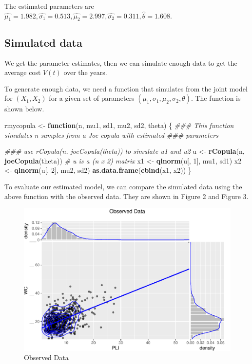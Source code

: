 \documentclass[11pt,]{article}
\newenvironment{Shaded}{\begin{snugshade}}{\end{snugshade}}
\newcommand{\CommentTok}[1]{\textcolor[rgb]{0.56,0.35,0.01}{\textit{#1}}}
\newcommand{\ControlFlowTok}[1]{\textcolor[rgb]{0.13,0.29,0.53}{\textbf{#1}}}
\newcommand{\DecValTok}[1]{\textcolor[rgb]{0.00,0.00,0.81}{#1}}
\newcommand{\KeywordTok}[1]{\textcolor[rgb]{0.13,0.29,0.53}{\textbf{#1}}}
\newcommand{\NormalTok}[1]{#1}
\newcommand{\StringTok}[1]{\textcolor[rgb]{0.31,0.60,0.02}{#1}}
\begin{document}
The estimated parameters are
\(\hat{\mu_{1}}= 1.982,\hat{\sigma_{1}}=0.513,\hat{\mu_{2}}=2.997,\hat{\sigma_{2}}=0.311,\hat{\theta}=1.608\).

\hypertarget{simulated-data}{%
\subsection{Simulated data}\label{simulated-data}}

We get the parameter estimates, then we can simulate enough data to get
the average cost \(V(t)\) over the years.

To generate enough data, we need a function that simulates from the
joint model for \((X_1,X_2)\) for a given set of parameters
\((\mu_{1}, \sigma_{1},\mu_{2},\sigma_{2},\theta)\). The function is
shown below.

\begin{Shaded}
\begin{Highlighting}[]
\NormalTok{rmycopula <-}\StringTok{ }\ControlFlowTok{function}\NormalTok{(n, mu1, sd1, mu2, sd2, theta) \{}
    \CommentTok{### This function simulates n samples from a Joe copula with estimated}
    \CommentTok{### parameters}
    
    \CommentTok{### use rCopula(n, joeCopula(theta)) to simulate u1 and u2}
\NormalTok{    u <-}\StringTok{ }\KeywordTok{rCopula}\NormalTok{(n, }\KeywordTok{joeCopula}\NormalTok{(theta))  }\CommentTok{# u is a (n x 2) matrix}
\NormalTok{    x1 <-}\StringTok{ }\KeywordTok{qlnorm}\NormalTok{(u[, }\DecValTok{1}\NormalTok{], mu1, sd1)}
\NormalTok{    x2 <-}\StringTok{ }\KeywordTok{qlnorm}\NormalTok{(u[, }\DecValTok{2}\NormalTok{], mu2, sd2)}
    \KeywordTok{as.data.frame}\NormalTok{(}\KeywordTok{cbind}\NormalTok{(x1, x2))}
\NormalTok{\}}
\end{Highlighting}
\end{Shaded}

To evaluate our estimated model, we can compare the simulated data using
the above function with the observed data. They are shown in Figure 2
and Figure 3.

\begin{figure}
\centering
\includegraphics{figs/unnamed-chunk-6.pdf}
\caption{Observed Data}
\end{figure}
\end{document}
